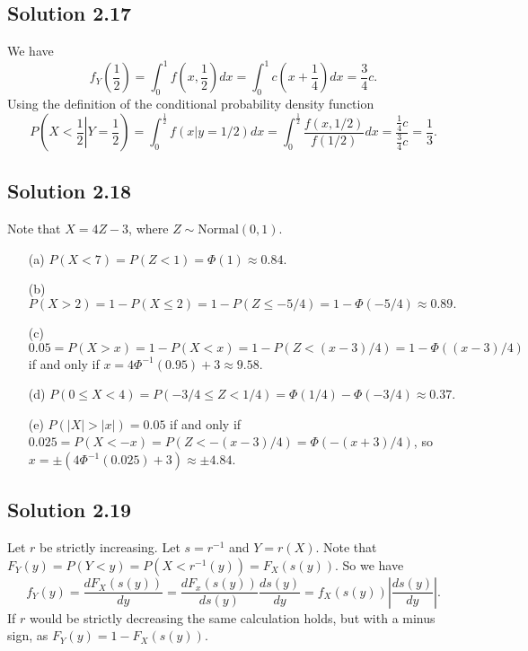 \subsection*{Solution 2.17}

We have
\begin{equation*}
    f_Y\left(\frac{1}{2}\right) = \int_0^1 f\left(x, \frac{1}{2}\right) dx = \int_0^1 c\left(x + \frac{1}{4}\right) dx = \frac{3}{4}c.
\end{equation*}
Using the definition of the conditional probability density function
\begin{equation*}
    P\left(X < \frac{1}{2} \left| Y = \frac{1}{2} \right.\right)
        = \int_0^{\frac{1}{2}} f(x | y = 1/2) dx
        = \int_0^{\frac{1}{2}} \frac{f(x, 1/2)}{f(1/2)} dx
        = \frac{\frac{1}{4}c}{\frac{3}{4}c}
        = \frac{1}{3}.
\end{equation*}


\subsection*{Solution 2.18}

Note that $X = 4Z - 3$, where $Z \sim \mathrm{Normal}(0, 1)$.
\begin{itemize}
    \item[(a)] $P(X < 7) = P(Z < 1) = \Phi(1) \approx 0.84$.
    \item[(b)] $P(X > 2) = 1 - P(X \leq 2) = 1 - P(Z \leq -5/4) = 1 - \Phi(-5/4) \approx 0.89.$
    \item[(c)] $0.05 = P(X > x) = 1 - P(X < x) = 1 - P(Z < (x - 3)/4) = 1 - \Phi((x - 3)/4)$ if and only if $x = 4 \Phi^{-1}(0.95) + 3 \approx 9.58$.
    \item[(d)] $P(0 \leq X < 4) = P(-3/4 \leq Z < 1/4) = \Phi(1/4) - \Phi(-3/4) \approx 0.37$.
    \item[(e)] $P(|X| > |x|) = 0.05$ if and only if $0.025 = P(X < -x) = P(Z < -(x - 3)/4) = \Phi(-(x + 3)/4)$, so $x = \pm (4\Phi^{-1}(0.025) + 3) \approx \pm 4.84$.
\end{itemize}


\subsection*{Solution 2.19}

Let $r$ be strictly increasing.
Let $s = r^{-1}$ and $Y = r(X)$.
Note that $F_Y(y) = P(Y < y) = P(X < r^{-1}(y)) = F_X(s(y))$.
So we have
\begin{equation*}
    f_Y(y) = \frac{dF_X(s(y))}{dy}
        = \frac{dF_x(s(y))}{ds(y)} \frac{ds(y)}{dy}
        = f_X(s(y)) \left|\frac{ds(y)}{dy}\right|.
\end{equation*}
If $r$ would be strictly decreasing the same calculation holds, but with a minus sign, as $F_Y(y) = 1 - F_X(s(y))$.


